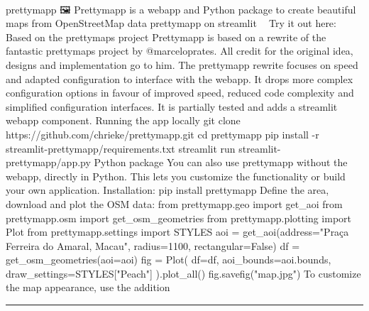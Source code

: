 \documentclass[10pt,a4paper]{article}
\begin{document}
\begin{multicols*}{2}
\paragraph{}
prettymapp 🖼️
Prettymapp is a webapp and Python package to create beautiful maps from OpenStreetMap data
prettymapp on streamlit 🎈🎈 Try it out here:
Based on the prettymaps project
Prettymapp is based on a rewrite of the fantastic prettymaps project by @marceloprates. All credit for the original idea, designs and implementation go to him. The prettymapp rewrite focuses on speed and adapted configuration to interface with the webapp. It drops more complex configuration options in favour of improved speed, reduced code complexity and simplified configuration interfaces. It is partially tested and adds a streamlit webapp component.
Running the app locally
git clone https://github.com/chrieke/prettymapp.git cd prettymapp pip install -r streamlit-prettymapp/requirements.txt streamlit run streamlit-prettymapp/app.py
Python package
You can also use prettymapp without the webapp, directly in Python. This lets you customize the functionality or build your own application.
Installation:
pip install prettymapp
Define the area, download and plot the OSM data:
from prettymapp.geo import get\_aoi from prettymapp.osm import get\_osm\_geometries from prettymapp.plotting import Plot from prettymapp.settings import STYLES aoi = get\_aoi(address="Praça Ferreira do Amaral, Macau", radius=1100, rectangular=False) df = get\_osm\_geometries(aoi=aoi) fig = Plot( df=df, aoi\_bounds=aoi.bounds, draw\_settings=STYLES["Peach"] ).plot\_all() fig.savefig("map.jpg")
To customize the map appearance, use the addition
\par\noindent\textcolor{red}{\rule{\linewidth}{0.2mm}}
\vfill
\null
\noindent\begin{minipage}{\linewidth}

\end{minipage}
\end{multicols*}
\end{document}
